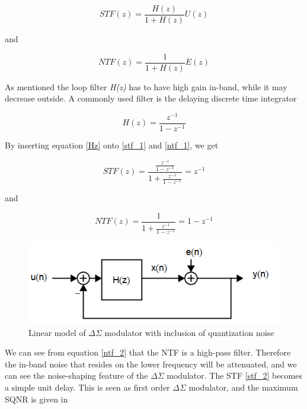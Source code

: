 \begin{equation}\label{stf_1}
    STF(z) = \frac{H(z)}{1+H(z)}U(z)
\end{equation}

and

\begin{equation}\label{ntf_1}
    NTF(z) = \frac{1}{1+H(z)}E(z)
\end{equation}

As mentioned the loop filter \textit{H(z)} has to have high gain in-band, while it may decrease outside. A commonly used filter is the delaying discrete time integrator

\begin{equation}\label{Hz}
    H(z) = \frac{z^{-1}}{1-z^{-1}}
\end{equation}

By inserting equation \ref{Hz} onto \ref{stf_1} and \ref{ntf_1}, we get

\begin{equation}\label{stf_2}
    STF(z) = \frac{\frac{z^{-1}}{1-z^{-1}}}{1 + \frac{z^{-1}}{1-z^{-1}}} = z^{-1}
\end{equation}

and

\begin{equation}\label{ntf_2}
    NTF(z) = \frac{1}{1 + \frac{z^{-1}}{1 - z^{-1}}} = 1 - z^{-1}
\end{equation}

\begin{figure}[h]
\centering
\includegraphics[scale=0.8]{images/linear_delta.png}
\caption{Linear model of $\Delta\Sigma$ modulator with inclusion of quantization noise \cite{Johns}}
\label{fig:linear}
\end{figure}

We can see from equation \ref{ntf_2} that the NTF is a high-pass filter. Therefore the in-band noise that resides on the lower frequency will be attenuated, and we can see the noise-shaping feature of the $\Delta\Sigma$ modulator. The STF \ref{stf_2} becomes a simple unit delay. This is seen as first order $\Delta\Sigma$ modulator, and the maximum SQNR is given in \cite[Ch.18.2.2]{Johns}


